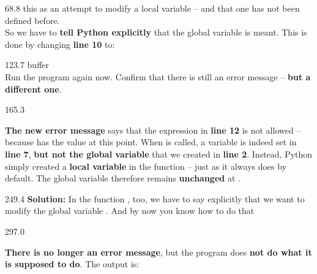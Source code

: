 \documentclass{aslab}
\begin{document}
\nextpage
\begin{region}[x=74.7,right=0,pitch=13.7]{68.8}
this as an attempt to modify a local variable  --
and that one has not been defined before.\\
So we have to \textbf{tell Python explicitly} that the global variable
 is meant. This is done by changing \textbf{line 10} to:
\end{region}

\begin{region}[x=74.7,right=0,pitch=13.65]{123.7}
buffer\\
Run the program again now. Confirm that there is still an error message
-- \textbf{but a different one}.
\end{region}

\begin{region}[pitch=14.02]{165.3}
\begin{ptasks}[start=3]
\item \textbf{The new error message} says that the expression
   in \textbf{line 12} is not allowed -- because
   has the value  at this point. When
   is called, a variable  is indeed set in \textbf{line 7},
  \textbf{but not the global variable} that we created in \textbf{line 2}.
  Instead, Python simply created a \textbf{local variable}  in
  the function  -- just as it always does by default. The
  global variable  therefore remains \textbf{unchanged} at
  .
\end{ptasks}
\end{region}

\begin{region}[x=74.7,right=0,pitch=17.7]{249.4}
\textbf{Solution:} In the function , too, we have to say
explicitly that we want to modify the global variable . And by
now you know how to do that 
\end{region}

\begin{region}[pitch=14.2]{297.0}
\begin{ptasks}[start=4]
\item \textbf{There is no longer an error message}, but the program does
  \textbf{not do what it is supposed to do}. The output is:
\end{ptasks}
\end{region}
\end{document}
